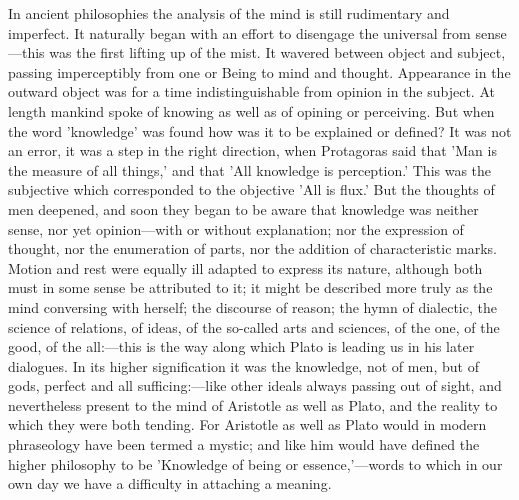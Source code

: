 \documentclass[11pt,letter]{article}
\begin{document}
\par  In ancient philosophies the analysis of the mind is still rudimentary and imperfect. It naturally began with an effort to disengage the universal from sense—this was the first lifting up of the mist. It wavered between object and subject, passing imperceptibly from one or Being to mind and thought. Appearance in the outward object was for a time indistinguishable from opinion in the subject. At length mankind spoke of knowing as well as of opining or perceiving. But when the word 'knowledge' was found how was it to be explained or defined? It was not an error, it was a step in the right direction, when Protagoras said that 'Man is the measure of all things,' and that 'All knowledge is perception.' This was the subjective which corresponded to the objective 'All is flux.' But the thoughts of men deepened, and soon they began to be aware that knowledge was neither sense, nor yet opinion—with or without explanation; nor the expression of thought, nor the enumeration of parts, nor the addition of characteristic marks. Motion and rest were equally ill adapted to express its nature, although both must in some sense be attributed to it; it might be described more truly as the mind conversing with herself; the discourse of reason; the hymn of dialectic, the science of relations, of ideas, of the so-called arts and sciences, of the one, of the good, of the all:—this is the way along which Plato is leading us in his later dialogues. In its higher signification it was the knowledge, not of men, but of gods, perfect and all sufficing:—like other ideals always passing out of sight, and nevertheless present to the mind of Aristotle as well as Plato, and the reality to which they were both tending. For Aristotle as well as Plato would in modern phraseology have been termed a mystic; and like him would have defined the higher philosophy to be 'Knowledge of being or essence,'—words to which in our own day we have a difficulty in attaching a meaning.
\end{document}
